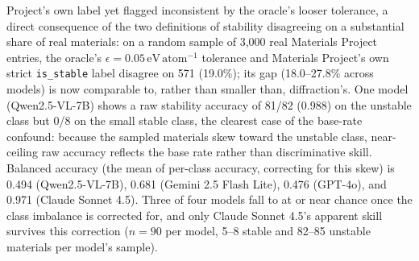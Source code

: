 \documentclass[pdflatex,sn-nature]{sn-jnl}
\begin{document}
Project's own label yet flagged inconsistent by the oracle's looser tolerance, a direct
consequence of the two definitions of stability disagreeing on a substantial share of real
materials: on a random sample of 3,000 real Materials Project entries, the oracle's
$\epsilon=0.05\,\mathrm{eV\,atom^{-1}}$ tolerance and Materials Project's own strict
\texttt{is\_stable} label disagree on 571 (19.0\%); its gap (18.0--27.8\% across models) is now
comparable to, rather than smaller than, diffraction's. One model (Qwen2.5-VL-7B) shows a raw stability accuracy
of 81/82 (0.988) on the unstable class but 0/8 on the small stable class, the clearest case of the base-rate confound: because the sampled materials skew
toward the unstable class, near-ceiling raw accuracy reflects the base rate rather than
discriminative skill. Balanced accuracy (the mean of per-class accuracy, correcting for
this skew) is 0.494 (Qwen2.5-VL-7B), 0.681 (Gemini 2.5 Flash Lite), 0.476 (GPT-4o), and
0.971 (Claude Sonnet 4.5). Three of four models fall to at or near chance once the
class imbalance is corrected for, and only Claude Sonnet 4.5's apparent skill survives
this correction ($n=90$ per model, 5--8 stable and 82--85 unstable materials per model's
sample).
\end{document}
